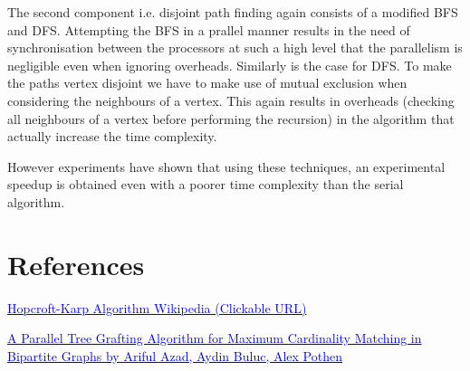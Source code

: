 \documentclass{article}
\begin{document}
The second component i.e. disjoint path finding again consists of a modified BFS and DFS. Attempting the BFS in a prallel manner results in the need of synchronisation between the processors at such a high level that the parallelism is negligible even when ignoring overheads. Similarly is the case for DFS. To make the paths vertex disjoint we have to make use of mutual exclusion when considering the neighbours of a vertex. This again results in overheads (checking all neighbours of a vertex before performing the recursion) in the algorithm that actually increase the time complexity. 

However experiments have shown that using these techniques, an experimental speedup is obtained even with a poorer time complexity than the serial algorithm.

\section{References}
\href{https://en.wikipedia.org/wiki/Hopcroft\%E2\%80\%93Karp_algorithm}{\textcolor{blue}{Hopcroft-Karp Algorithm Wikipedia (Clickable URL)}}

\href{https://people.eecs.berkeley.edu/~aydin/matchingGraft.pdf}{\textcolor{blue}{A Parallel Tree Grafting Algorithm for Maximum Cardinality Matching in Bipartite Graphs by Ariful Azad, Aydin Buluc, Alex Pothen}}
\end{document}
